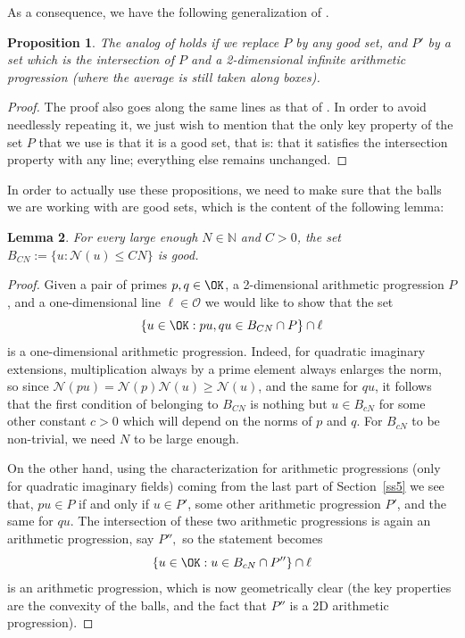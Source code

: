 \documentclass[11pt]{amsart}
\newtheorem{lemma}{Lemma}[section]
\newtheorem{proposition}[lemma]{Proposition}
\theoremstyle{definition}
\newcommand{\N}{{\mathbb N}}
\newcommand{\NN}{{\mathcal N}}
\begin{document}
As a consequence, we have the following generalization of \cite[Theorem 8.1]{S23}.
\begin{proposition}\label{8.1s2}
    The analog of \cite[Theorem 8.1]{S23} holds if we replace $P$ by any good set, and $P'$ by a set which is the intersection of $P$ and a 2-dimensional infinite arithmetic progression (where the average is still taken along boxes).
\end{proposition}
\begin{proof}
    The proof also goes along the same lines as that of \cite[Theorem~8.1]{S23}. In order to avoid needlessly repeating it, we just wish to mention that the only key property of the set $P$ that we use is that it is a good set, that is: that it satisfies the intersection property with any line; everything else remains unchanged.
\end{proof}
In order to actually use these propositions, we need to make sure that the balls we are working with are good sets, which is the content of the following lemma:
\begin{lemma}\label{7.1s23}
For every large enough $N \in \N$ and $C>0$, the set $B_{CN}:=\{u\colon\NN(u)\leq CN\}$ is good.
\end{lemma}
\begin{proof}
Given a pair of primes $p, q \in \OK$, a 2-dimensional arithmetic progression $P$, and a one-dimensional line $\ell \in \mathcal{O}$ we would like to show that the set 
\[
\{ u \in \OK : pu, qu \in B_{CN} \cap P\} \cap \ell
\]
is a one-dimensional arithmetic progression. Indeed, for quadratic imaginary extensions, multiplication always by a prime element always enlarges the norm, so since $\NN(pu)=\NN(p)\NN(u) \geq \NN(u)$, and the same for $qu$, it follows that the first condition of belonging to $B_{CN}$ is nothing but $u \in B_{cN}$ for some other constant $c>0$ which will depend on the norms of $p$ and $q$. For $B_{cN}$ to be non-trivial, we need $N$ to be large enough. 

On the other hand, using the characterization for arithmetic progressions (only for quadratic imaginary fields) coming from the last part of Section~\ref{ss5} we see that, $pu \in P$ if and only if $u \in P'$, some other arithmetic progression $P'$, and the same for $qu$. The intersection of these two arithmetic progressions is again an arithmetic progression, say $P'',$ so the statement becomes
\[
\{u \in \OK : u \in B_{cN} \cap P''\} \cap \ell
\]
is an arithmetic progression, which is now geometrically clear (the key properties are the convexity of the balls, and the fact that $P''$ is a 2D arithmetic progression).
\end{proof}
\end{document}
